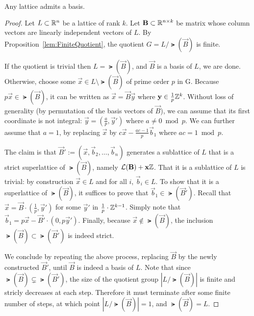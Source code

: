 \begin{theorem}\label{thm:alwaysABasis} Any lattice admits a basis.
\end{theorem}
\begin{proof}
Let $L \subset \mathbb{R}^n$ be a lattice of rank $k$. Let $\mathbf{B} \subset \mathbb{R}^{n \times k}$ be matrix whose column vectors are linearly independent vectors of $L$. By Proposition~\ref{lem:FiniteQuotient}, the quotient $G = L/\lat(\vec B)$ is finite. 

If the quotient is trivial then $L=\lat(\vec B)$, and $\vec B$ is a basis of $L$, we are done.
Otherwise, choose some $\vec x \in L \setminus \lat(\vec B)$ of prime order $p$ in G.
Because $p \vec x \in \lat(\vec B)$, it can be written as $\vec x = \vec B \vec y$ where $\mathbf{y} \in \frac 1 p \mathbb{Z}^k$.
Without loss of generality (by permutation of the basis vectors of $\vec B$), we can assume that its first coordinate is not integral: $\vec y = (\frac a p, \vec y')$ where $a \neq 0 \bmod p$.
We can further assume that $a=1$, by replacing $\vec x$ by $c \vec x - \frac {ac - 1} p \vec b_1$ where $ac = 1 \bmod p$.

The claim is that $\vec B' := (\vec x, \vec b_2, \dots, \vec b_n)$ generates a sublattice of $L$ that is a strict superlattice of $\lat(\vec B)$, namely $\mathcal{L}(\mathbf{B}) + \mathbf{x} \mathbb{Z}$.
That it is a sublattice of $L$ is trivial: by construction $\vec x \in L$ and for all $i$, $\vec b_i \in L$.
To show that it is a superlattice of $\lat(\vec B)$, it suffices to prove that $\vec b_1 \in \lat(\vec B')$.
Recall that $\vec x = \vec B \cdot (\frac 1 p, \vec y')$ for some $\vec y'$ in $\frac 1 p \cdot \mathbb{Z}^{k-1}$.
Simply note that $\vec b_1 = p \vec x - \vec B' \cdot (0, p \vec y')$.
Finally, because $\vec x \not \in \lat(\vec B)$, the inclusion $\lat(\vec B) \subset \lat(\vec B')$ is indeed strict.

We conclude by repeating the above process, replacing $\vec B$ by the newly constructed $\vec B'$, until $\vec B$ is indeed a basis of $L$.
Note that since $\lat(\vec B) \subsetneq \lat(\vec B')$, the size of the quotient group $|L / \lat(\vec B)|$ is finite and stricly decreases at each step.
Therefore it must terminate after some finite number of steps, at which point $|L/\lat(\vec B)| = 1$, and $\lat(\vec B) = L$.
\end{proof}


